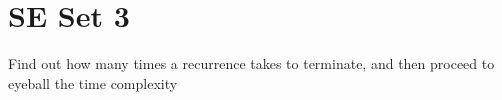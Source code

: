 \documentclass[10pt,a4paper]{article}
\begin{document}
\begin{multicols}{3}
\begin{itemize}
    \end{itemize}


    \section{SE Set 3}
    Find out how many times a recurrence takes to terminate, and then proceed to eyeball the time complexity
    
\end{multicols}
\end{document}
